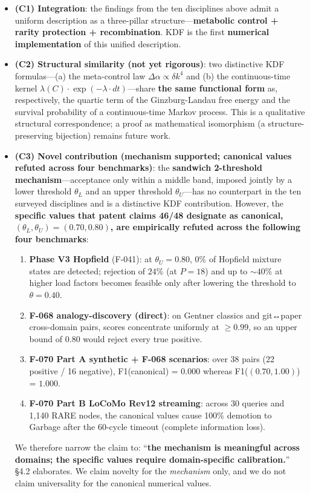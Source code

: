 \begin{itemize}
\item
  \textbf{(C1) Integration}: the findings from the ten disciplines above admit a uniform description as a three-pillar structure---\textbf{metabolic control + rarity protection + recombination}. KDF is the first \textbf{numerical implementation} of this unified description.
\item
  \textbf{(C2) Structural similarity (not yet rigorous)}: two distinctive KDF formulas---(a) the meta-control law \(\Delta \alpha \propto \delta k^4\) and (b) the continuous-time kernel \(\lambda(C) \cdot \exp(-\lambda \cdot dt)\)---share \textbf{the same functional form} as, respectively, the quartic term of the Ginzburg-Landau free energy and the survival probability of a continuous-time Markov process. This is a qualitative structural correspondence; a proof as mathematical isomorphism (a structure-preserving bijection) remains future work.
\item
  \textbf{(C3) Novel contribution (mechanism supported; canonical values refuted across four benchmarks)}: the \textbf{sandwich 2-threshold mechanism}---acceptance only within a middle band, imposed jointly by a lower threshold \(\theta_L\) and an upper threshold \(\theta_U\)---has no counterpart in the ten surveyed disciplines and is a distinctive KDF contribution. However, the \textbf{specific values that patent claims 46/48 designate as canonical, \((\theta_L, \theta_U) = (0.70, 0.80)\), are empirically refuted across the following four benchmarks}:

  \begin{enumerate}
  \def\labelenumi{\arabic{enumi}.}
  \tightlist
  \item
    \textbf{Phase V3 Hopfield} (F-041): at \(\theta_U = 0.80\), \(0\%\) of Hopfield mixture states are detected; rejection of \(24\%\) (at \(P = 18\)) and up to \(\sim 40\%\) at higher load factors becomes feasible only after lowering the threshold to \(\theta = 0.40\).
  \item
    \textbf{F-068 analogy-discovery (direct)}: on Gentner classics and git↔paper cross-domain pairs, scores concentrate uniformly at \(\ge 0.99\), so an upper bound of \(0.80\) would reject every true positive.
  \item
    \textbf{F-070 Part A synthetic + F-068 scenarios}: over 38 pairs (22 positive / 16 negative), F1(canonical) = \(0.000\) whereas F1(\((0.70, 1.00)\)) = \(1.000\).
  \item
    \textbf{F-070 Part B LoCoMo Rev12 streaming}: across 30 queries and 1,140 RARE nodes, the canonical values cause 100\% demotion to Garbage after the 60-cycle timeout (complete information loss).
  \end{enumerate}

  We therefore narrow the claim to: ``\textbf{the mechanism is meaningful across domains; the specific values require domain-specific calibration.}'' §4.2 elaborates. We claim novelty for the \emph{mechanism} only, and we do not claim universality for the canonical numerical values.
\end{itemize}

